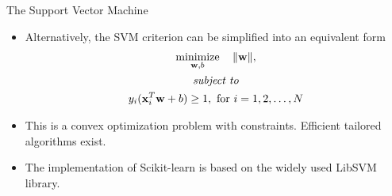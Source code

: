 \documentclass[10pt, aspectratio=169]{beamer} %
\newcommand{\w}{{\bf w}}
\newcommand{\x}{{\bf x}}
\begin{document}
\begin{frame}[fragile,allowframebreaks=0.8]
 {The Support Vector Machine}

\begin{itemize}
\item Alternatively, the SVM criterion can be simplified into an equivalent form
\begin{gather*}
 \mathop{\text{minimize}}_{\w, b}  \quad \|\w\|,  \\
 \textit{subject to} \\
 y_i(\x_i^T\w + b) \geq 1, \text{ for } i = 1,2,\ldots, N 
\end{gather*}
\item This is a convex optimization problem with constraints. Efficient
tailored algorithms exist.
\item The implementation of Scikit-learn is based on the widely used
LibSVM library.
\end{itemize}
\end{frame}
\end{document}
